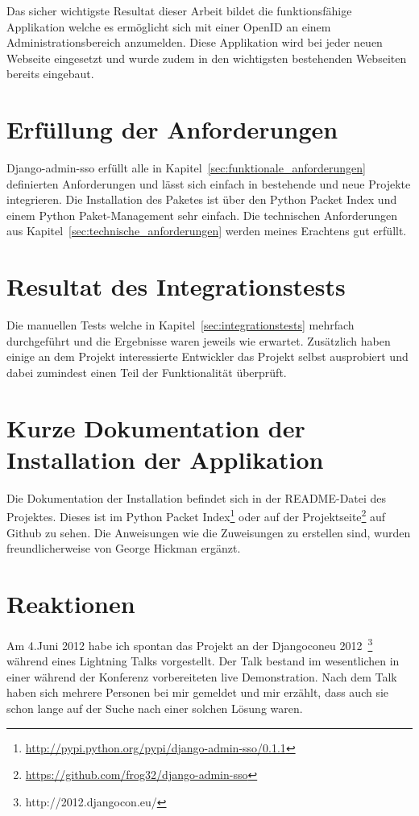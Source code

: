 Das sicher wichtigste Resultat dieser Arbeit bildet die funktionsfähige Applikation welche es ermöglicht sich mit einer OpenID an einem Administrationsbereich anzumelden. Diese Applikation wird bei jeder neuen Webseite eingesetzt und wurde zudem in den wichtigsten bestehenden Webseiten bereits eingebaut.

\section{Erfüllung der Anforderungen}
\label{sec:erfüllung_der_anforderungen}
Django-admin-sso erfüllt alle in Kapitel~\ref{sec:funktionale_anforderungen} definierten Anforderungen und lässt sich einfach in bestehende und neue Projekte integrieren. Die Installation des Paketes ist über den Python Packet Index und einem Python Paket-Management sehr einfach. Die technischen Anforderungen aus Kapitel~\ref{sec:technische_anforderungen} werden meines Erachtens gut erfüllt.

\section{Resultat des Integrationstests}
\label{sec:resultat_des_integrationstests}
Die manuellen Tests welche in Kapitel~\ref{sec:integrationstests} mehrfach durchgeführt und die Ergebnisse waren jeweils wie erwartet. Zusätzlich haben einige an dem Projekt interessierte Entwickler das Projekt selbst ausprobiert und dabei zumindest einen Teil der Funktionalität überprüft.

\section{Kurze Dokumentation der Installation der Applikation}
\label{sec:kurze_dokumentation_der_installation_der_applikation}
Die Dokumentation der Installation befindet sich in der README-Datei des Projektes. Dieses ist im Python Packet Index\footnote{\url{http://pypi.python.org/pypi/django-admin-sso/0.1.1}} oder auf der Projektseite\footnote{\url{https://github.com/frog32/django-admin-sso}} auf Github zu sehen. Die Anweisungen wie die Zuweisungen zu erstellen sind, wurden freundlicherweise von George Hickman ergänzt.

\section{Reaktionen}
\label{sec:reaktionen}
Am 4.Juni 2012 habe ich spontan das Projekt an der Djangoconeu 2012~\footnote{http://2012.djangocon.eu/} während eines Lightning Talks vorgestellt. Der Talk bestand im wesentlichen in einer während der Konferenz vorbereiteten live Demonstration. Nach dem Talk haben sich mehrere Personen bei mir gemeldet und mir erzählt, dass auch sie schon lange auf der Suche nach einer solchen Lösung waren.

